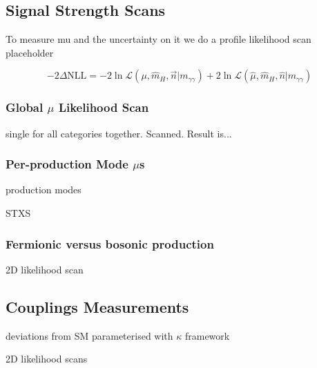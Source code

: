 \subsection{Signal Strength Scans}
To measure mu and the uncertainty on it we do a profile likelihood scan
placeholder

\begin{equation}
    -2\Delta{\mathrm{NLL}} = -2\ln{\mathcal{L}}(\mu,\hat{m}_H,\vec{n} | m_{\gamma\gamma}) + 2\ln\mathcal{L}(\hat{\mu},\hat{m}_{H},\hat{n} | m_{\gamma\gamma})
\end{equation}

\subsubsection{Global $\mu$ Likelihood Scan}
single for all categories together. Scanned. Result is...

\subsubsection{Per-production Mode $\mu$s}
production modes

STXS

\subsubsection{Fermionic versus bosonic production}
2D likelihood scan





\subsection{Couplings Measurements}
deviations from SM parameterised with $\kappa$ framework

2D likelihood scans









